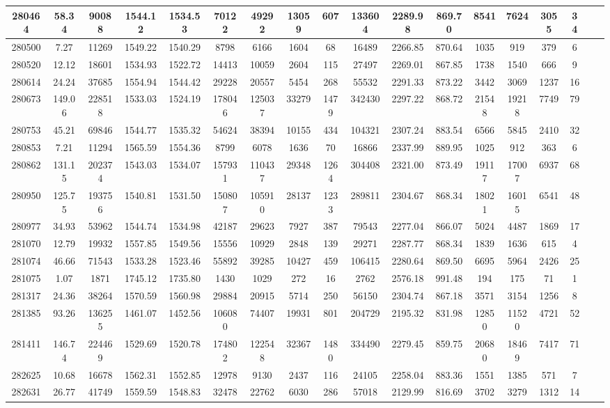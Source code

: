 \documentclass[10pt]{extarticle}
\begin{document}
\begin{longtable}{|c|c|c|c|c|c|c|c|c|c|c|c|c|c|c|c|c|c|}
\hline 
280464&58.34&90088&1544.12&1534.53&70122&49292&13059&607&133604&2289.98&869.70&8541&7624&3055&34 \\ 
\hline 
280500&7.27&11269&1549.22&1540.29&8798&6166&1604&68&16489&2266.85&870.64&1035&919&379&6 \\ 
\hline 
280520&12.12&18601&1534.93&1522.72&14413&10059&2604&115&27497&2269.01&867.85&1738&1540&666&9 \\ 
\hline 
280614&24.24&37685&1554.94&1544.42&29228&20557&5454&268&55532&2291.33&873.22&3442&3069&1237&16 \\ 
\hline 
280673&149.06&228518&1533.03&1524.19&178046&125037&33279&1479&342430&2297.22&868.72&21548&19218&7749&79 \\ 
\hline 
280753&45.21&69846&1544.77&1535.32&54624&38394&10155&434&104321&2307.24&883.54&6566&5845&2410&32 \\ 
\hline 
280853&7.21&11294&1565.59&1554.36&8799&6078&1636&70&16866&2337.99&889.95&1025&912&363&6 \\ 
\hline 
280862&131.15&202374&1543.03&1534.07&157931&110437&29348&1264&304408&2321.00&873.49&19117&17007&6937&68 \\ 
\hline 
280950&125.75&193756&1540.81&1531.50&150807&105910&28137&1233&289811&2304.67&868.34&18021&16015&6541&48 \\ 
\hline 
280977&34.93&53962&1544.74&1534.98&42187&29623&7927&387&79543&2277.04&866.07&5024&4487&1869&17 \\ 
\hline 
281070&12.79&19932&1557.85&1549.56&15556&10929&2848&139&29271&2287.77&868.34&1839&1636&615&4 \\ 
\hline 
281074&46.66&71543&1533.28&1523.46&55892&39285&10427&459&106415&2280.64&869.50&6695&5964&2426&25 \\ 
\hline 
281075&1.07&1871&1745.12&1735.80&1430&1029&272&16&2762&2576.18&991.48&194&175&71&1 \\ 
\hline 
281317&24.36&38264&1570.59&1560.98&29884&20915&5714&250&56150&2304.74&867.18&3571&3154&1256&8 \\ 
\hline 
281385&93.26&136255&1461.07&1452.56&106080&74407&19931&801&204729&2195.32&831.98&12850&11520&4721&52 \\ 
\hline 
281411&146.74&224469&1529.69&1520.78&174802&122548&32367&1480&334490&2279.45&859.75&20680&18469&7417&71 \\ 
\hline 
282625&10.68&16678&1562.31&1552.85&12978&9130&2437&116&24105&2258.04&883.36&1551&1385&571&7 \\ 
\hline 
282631&26.77&41749&1559.59&1548.83&32478&22762&6030&286&57018&2129.99&816.69&3702&3279&1312&14 \\ 

\end{longtable}
\end{document}
